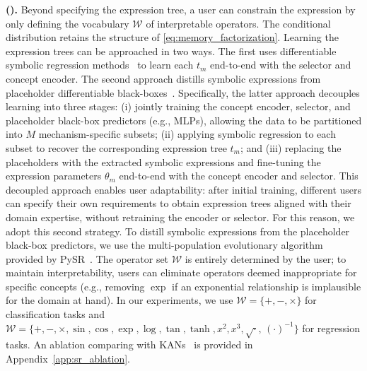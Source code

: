 \documentclass{article}
\theoremstyle{plain}
\theoremstyle{definition}
\theoremstyle{remark}
\newcommand{\mypar}[1]{\noindent\textbf{#1}}
\begin{document}
\mypar{\symbolic{} (\symbolicacro{}).} Beyond specifying the expression tree, a user can constrain the expression by only defining the vocabulary $\mathcal{W}$ of interpretable operators. The conditional distribution retains the structure of \cref{eq:memory_factorization}.
Learning the expression trees can be approached in two ways. The first uses differentiable symbolic regression methods~\citep{martius2016extrapolation} to learn each $t_m$ end-to-end with the selector and concept encoder. The second approach distills symbolic expressions from placeholder differentiable black-boxes~\citep{alaa2019demystifying,cranmer2020discovering,liu2025kan}. Specifically, the latter approach decouples learning into three stages: (i) jointly training the concept encoder, selector, and placeholder black-box predictors (e.g., MLPs), allowing the data to be partitioned into $M$ mechanism-specific subsets; (ii) applying symbolic regression to each subset to recover the corresponding expression tree $t_m$; and (iii) replacing the placeholders with the extracted symbolic expressions and fine-tuning the expression parameters $\theta_m$ end-to-end with the concept encoder and selector. This decoupled approach enables user adaptability: after initial training, different users can specify their own requirements to obtain expression trees aligned with their domain expertise, without retraining the encoder or selector. For this reason, we adopt this second strategy. To distill symbolic expressions from the placeholder black-box predictors, we use the multi-population evolutionary algorithm provided by PySR~\citep{cranmer2023interpretable}. The operator set $\mathcal{W}$ is entirely determined by the user; to maintain interpretability, users can eliminate operators deemed inappropriate for specific concepts (e.g., removing $\exp$ if an exponential relationship is implausible for the domain at hand). In our experiments, we use $\mathcal{W} = \{+, -, \times\}$ for classification tasks and $\mathcal{W} = \{+, -, \times, \sin, \cos, \exp, \log, \tan, \tanh, x^2, x^3, \sqrt{\cdot},\, (\cdot)^{-1}\}$ for regression tasks. An ablation comparing with KANs~\citep{liu2025kan} is provided in Appendix~\ref{app:sr_ablation}.
\end{document}
